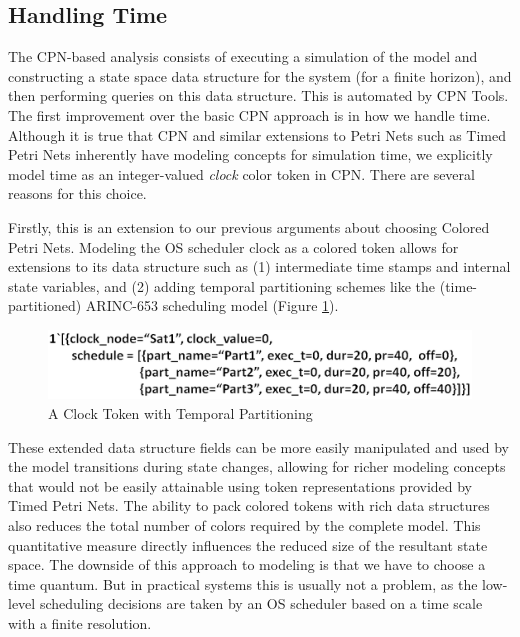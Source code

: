\subsection{Handling Time}
\label{handling_time}

The CPN-based analysis consists of executing a simulation of the model and constructing a state space data structure for the system (for a finite horizon), and then performing queries on this data structure. This is automated by CPN Tools. The first improvement over the basic CPN approach is in how we handle time. Although it is true that CPN and similar extensions to Petri Nets such as Timed Petri Nets inherently have modeling concepts for simulation time, we explicitly model time as an integer-valued \emph{clock} color token in CPN. There are several reasons for this choice. 

Firstly, this is an extension to our previous arguments about choosing Colored Petri Nets. Modeling the OS scheduler clock as a colored token allows for extensions to its data structure such as (1) intermediate time stamps and internal state variables, and (2) adding temporal partitioning schemes like the (time-partitioned) ARINC-653 \cite{ARINC-653} scheduling model (Figure \ref{fig:clock}). 

\begin{figure}[h]
	\centering
	\includegraphics[width=\textwidth]{./img/clock}
	\caption{A Clock Token with Temporal Partitioning}
	\label{fig:clock}
\end{figure}

These extended data structure fields can be more easily manipulated and used by the model transitions during state changes, allowing for richer modeling concepts that would not be easily attainable using token representations provided by Timed Petri Nets. The ability to pack colored tokens with rich data structures also reduces the total number of colors required by the complete model. This quantitative measure directly influences the reduced size of the resultant state space. The downside of this approach to modeling is that we have to choose a time quantum. But in practical systems this is usually not a problem, as the low-level scheduling decisions are taken by an OS scheduler based on a time scale with a finite resolution. 

